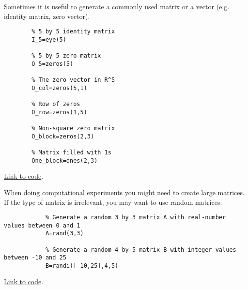\documentclass{ximera}
\begin{document}
    \begin{template}\label{temp:id_matrix}
    Sometimes it is useful to generate a commonly used matrix or a vector (e.g. identity matrix, zero vector). 
    
    \begin{verbatim}
        % 5 by 5 identity matrix
        I_5=eye(5)
        
        % 5 by 5 zero matrix
        O_5=zeros(5)
        
        % The zero vector in R^5
        O_col=zeros(5,1)
        
        % Row of zeros
        O_row=zeros(1,5)
        
        % Non-square zero matrix
        O_block=zeros(2,3)
        
        % Matrix filled with 1s
        One_block=ones(2,3)
    \end{verbatim}
    
    \href{https://sagecell.sagemath.org/?z=eJxdzT0OwjAMBeA9Uu7gpRJIYSgoIwdgAKSKGdQfV40IsUgDoZyepk06sHiwv_ecgYRqGIdq0DjlBniUzqoPZ4eb3OOAK7nmjLMsuS9aWsx5NGHRL-rS4UzeWDuyoAwUVxlkTTpZkUddkAdqp0AfjCUfTS5S44nMpn--Sov_vytN9T36rdhFf5zu0CqtsQGvXAd5KDcYA2Rw9j9PMkr_&lang=octave&interacts=eJyLjgUAARUAuQ==}{Link to code}.
    \end{template}
    
    \begin{template}\label{temp:randMat}
        When doing computational experiments you might need to create large matrices.  If the type of matrix is irrelevant, you may want to use random matrices.
    
        \begin{verbatim}
            % Generate a random 3 by 3 matrix A with real-number values between 0 and 1
            A=rand(3,3)
            
            % Generate a random 4 by 5 matrix B with integer values between -10 and 25
            B=randi([-10,25],4,5)
        \end{verbatim}
    
    \href{https://sagecell.sagemath.org/?z=eJxtzLEKwjAUheE9kHc4S6GFFGzTjA7t0ocQhxu8aKCJEFNb397U4qTLGX44X4GRA0dKDEKkcLl7aNhXHk8puhU9FpduiExTHWZvOeJJ08wPWE4Lc8AB-YdGiv64CaVWupJCiuKP3W22-drDbruQ-Prr1s0ut0aK4UO78pSjas1ZdcpUb3XOOqE=&lang=octave&interacts=eJyLjgUAARUAuQ==}{Link to code}.    
    \end{template}
\end{document}
